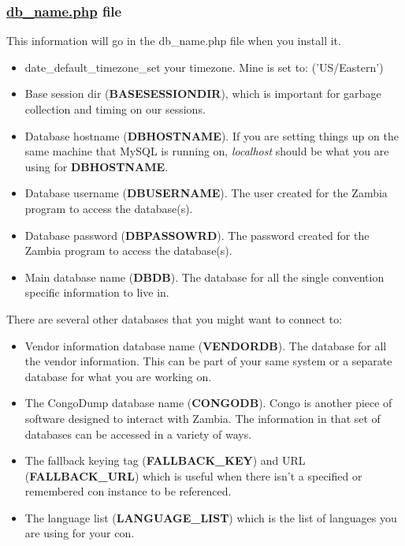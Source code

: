 \documentclass[captions=tablesignature]{scrartcl}
\begin{document}
\subsubsection{\href{../Local/db_name.php}{db\_name.php} file}
\label{sec-1-2-3}
This information will go in the db\_name.php file when you install it.
\begin{itemize}
\item date\_default\_timezone\_set your timezone.  Mine is set to:
('US/Eastern')
\item Base session dir (\textbf{BASESESSIONDIR}), which is important for
garbage collection and timing on our sessions.
\item Database hostname (\textbf{DBHOSTNAME}). If you are setting things up on
the same machine that MySQL is running on, \emph{localhost} should be
what you are using for \textbf{DBHOSTNAME}.
\item Database username (\textbf{DBUSERNAME}).  The user created for the
Zambia program to access the database(s).
\item Database password (\textbf{DBPASSOWRD}).  The password created for the
Zambia program to access the database(s).
\item Main database name (\textbf{DBDB}).  The database for all the single
convention specific information to live in.
\end{itemize}
There are several other databases that you might want to connect to:
\begin{itemize}
\item Vendor information database name (\textbf{VENDORDB}).  The database
for all the vendor information.  This can be part of your same
system or a separate database for what you are working on.
\item The CongoDump database name (\textbf{CONGODB}). Congo is another piece of
software designed to interact with Zambia. The information in
that set of databases can be accessed in a variety of ways.
\item The fallback keying tag (\textbf{FALLBACK\_KEY}) and URL
(\textbf{FALLBACK\_URL}) which is useful when there isn't a specified
or remembered con instance to be referenced.
\item The language list (\textbf{LANGUAGE\_LIST}) which is the list of
languages you are using for your con.
\end{itemize}
\end{document}

